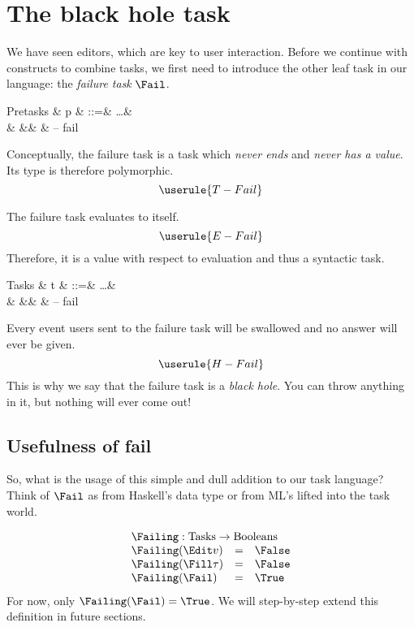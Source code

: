 
\section{The black hole task}

We have seen editors,
which are key to user interaction.
Before we continue with constructs to combine tasks,
we first need to introduce the other leaf task in our language:
the \emph{failure task} $\Fail$.

\begin{grammar}
  Pretasks
    & p & ::=& \ldots & \\
    &   &\mid& \Fail  & – fail \\
\end{grammar}
Conceptually,
the failure task is a task which \emph{never ends} and \emph{never has a value}.
Its type is therefore polymorphic.
\begin{equation*}
  \userule{T-Fail}
\end{equation*}

The failure task evaluates to itself.
\begin{equation*}
  \userule{E-Fail}
\end{equation*}
Therefore,
it is a value with respect to evaluation and thus a syntactic task.
\begin{grammar}
  Tasks
    & t & ::=& \ldots & \\
    &   &\mid& \Fail  & – fail \\
\end{grammar}

Every event users sent to the failure task will be swallowed
and no answer will ever be given.
\begin{equation*}
  \userule{H-Fail}
\end{equation*}
This is why we say that the failure task is a \emph{black hole}.
You can throw anything in it,
but nothing will ever come out!


\subsection{Usefulness of fail}

So, what is the usage of this simple and dull addition to our task language?
Think of $\Fail$ as  from Haskell's  data type
or  from ML's  lifted into the task world.

\begin{equation*}
  \begin{array}{lcl}
    \multicolumn{3}{l}{\Failing : \mathrm{Tasks} \to \mathrm{Booleans}} \\
    \Failing(\Edit v)    &=& \False \\
    \Failing(\Fill \tau) &=& \False \\
    \Failing(\Fail)      &=& \True
  \end{array}
\end{equation*}
For now,
only $\Failing(\Fail) = \True$.
We will step-by-step extend this definition in future sections.


